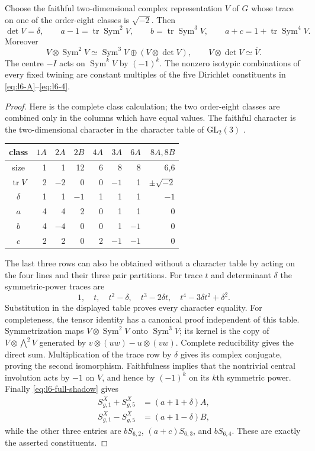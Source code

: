 \begin{theorem}\label{thm:l6-sympowers}
Choose the faithful two-dimensional complex representation $V$ of $G$
whose trace on one of the order-eight classes is $\sqrt{-2}$.  Then
\[
 \det V=\delta,\qquad
 a-1=\operatorname{tr}\operatorname{Sym}^2V,\qquad
 b=\operatorname{tr}\operatorname{Sym}^3V,\qquad
 a+c=1+\operatorname{tr}\operatorname{Sym}^4V.
\]
Moreover
\[
 V\otimes\operatorname{Sym}^2V
   \simeq\operatorname{Sym}^3V\oplus(V\otimes\det V),\qquad
 V\otimes\det V\simeq\overline V.
\]
The centre $-I$ acts on $\operatorname{Sym}^kV$ by $(-1)^k$.
The nonzero isotypic combinations of every fixed twining are constant
multiples of the five Dirichlet constituents in
\eqref{eq:l6-A}--\eqref{eq:l6-4}.
\end{theorem}
\begin{proof}
Here is the complete class calculation; the two order-eight classes are
combined only in the columns which have equal values.  The faithful
character is the two-dimensional character in the character table of
$\mathrm{GL}_2(3)$ \cite[Table~15, p.~91]{CDH2014}.
\begin{center}
\begin{tabular}{c|rrrrrrr}
class&$1A$&$2A$&$2B$&$4A$&$3A$&$6A$&$8A,8B$\\\hline
size&1&1&12&6&8&8&6,6\\
$\operatorname{tr}V$&2&$-2$&0&0&$-1$&1&$\pm\sqrt{-2}$\\
$\delta$&1&1&$-1$&1&1&1&$-1$\\
$a$&4&4&2&0&1&1&0\\
$b$&4&$-4$&0&0&1&$-1$&0\\
$c$&2&2&0&2&$-1$&$-1$&0
\end{tabular}
\end{center}
The last three rows can also be obtained without a character table by acting
on the four lines and their three pair partitions.  For trace $t$ and
determinant $\delta$ the symmetric-power traces are
\[
 1,\quad t,\quad t^2-\delta,\quad t^3-2\delta t,
 \quad t^4-3\delta t^2+\delta^2.
\]
Substitution in the displayed table proves every character equality.
For completeness, the tensor identity has a canonical proof independent of
this table.  Symmetrization maps $V\otimes\operatorname{Sym}^2V$ onto
$\operatorname{Sym}^3V$; its kernel is the copy of
$V\otimes\bigwedge^2V$ generated by
$v\otimes(uw)-u\otimes(vw)$.  Complete reducibility gives the direct sum.
Multiplication of the trace row by $\delta$ gives its complex conjugate,
proving the second isomorphism.  Faithfulness implies that the nontrivial
central involution acts by $-1$ on $V$, and hence by $(-1)^k$ on its
$k$th symmetric power.
Finally \eqref{eq:l6-full-shadow} gives
\begin{align*}
 S^X_{g,1}+S^X_{g,5}&=(a+1+\delta)A,\\
 S^X_{g,1}-S^X_{g,5}&=(a+1-\delta)B,
\end{align*}
while the other three entries are $bS_{6,2}$, $(a+c)S_{6,3}$, and
$bS_{6,4}$.  These are exactly the asserted constituents.
\end{proof}

